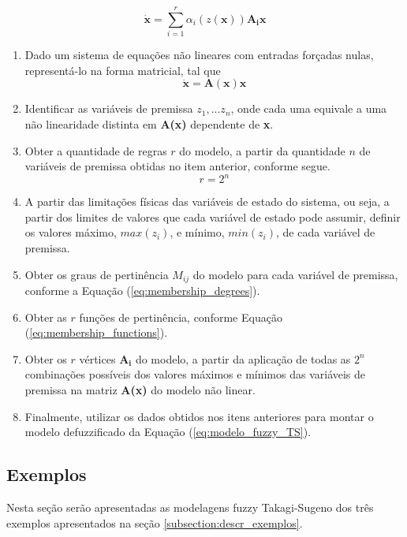 \begin{equation}\label{eq:modelo_fuzzy_TS}
\mathbf{\dot{x}} =\sum_{i=1}^{r}\alpha_i(z( \mathbf{x})) \mathbf{A_ix}
\end{equation}

\begin{enumerate}
\item Dado um sistema de equações não lineares com entradas forçadas nulas, representá-lo na forma matricial, tal que
\begin{equation*}
\mathbf{\dot{x}} = \mathbf{A(x)x}
\end{equation*}
\item Identificar as variáveis de premissa $z_1, ... z_n$, onde cada uma equivale a uma não linearidade distinta em \textbf{A(x)} dependente de  \textbf{x}.
\item Obter a quantidade de regras $r$ do modelo, a partir da quantidade $n$ de variáveis de premissa obtidas no item anterior, conforme segue.
\begin{equation*}
r = 2^n
\end{equation*}
\item A partir das limitações físicas das variáveis de estado do sistema, ou seja, a partir dos limites de valores que cada variável de estado pode assumir, definir os valores máximo, $max(z_i)$, e mínimo, $min(z_i)$, de cada variável de premissa.
\item Obter os graus de pertinência $M_{ij}$ do modelo para cada variável de premissa, conforme a Equação (\ref{eq:membership_degrees}).
\item Obter as $r$ funções de pertinência, conforme Equação (\ref{eq:membership_functions}).
\item Obter os $r$ vértices $\mathbf{A_i}$ do modelo, a partir da aplicação de todas as $2^n$ combinações possíveis dos valores máximos e mínimos das variáveis de premissa na matriz \textbf{A(x)} do modelo não linear.
\item Finalmente, utilizar os dados obtidos nos itens anteriores para montar o modelo defuzzificado da Equação (\ref{eq:modelo_fuzzy_TS}).
\end{enumerate}

\subsection{Exemplos}

Nesta seção serão apresentadas as modelagens fuzzy Takagi-Sugeno dos três exemplos apresentados na seção \ref{subsection:descr_exemplos}.

